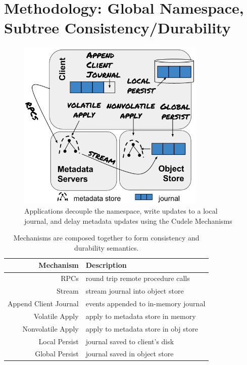 \section{Methodology: Global Namespace, Subtree Consistency/Durability}
\label{sec:methodology-decoupled-namespaces}

\begin{figure}[tb]
\centering
\includegraphics[width=90mm]{figures/fig-decouple.png}
\caption{Applications decouple the namespace, write updates to a local journal,
and delay metadata updates using the Cudele Mechanisms }\label{fig:decouple}
\end{figure}

\begin{table}
\begin{tabular}{ r | l }
  Mechanism         & Description \\\hline
  RPCs              & round trip remote procedure calls \\
  Stream            & stream journal into object store \\
  Append Client Journal & events appended to in-memory journal \\
  Volatile Apply & apply to metadata store in memory \\
  Nonvolatile Apply    & apply to metadata store in obj store \\
  Local Persist     & journal saved to client's disk \\
  Global Persist    & journal saved in object store \\
\end{tabular}
\caption{Mechanisms are composed together to form consistency and
durability semantics.\label{table:mechanisms}} 
\end{table}


